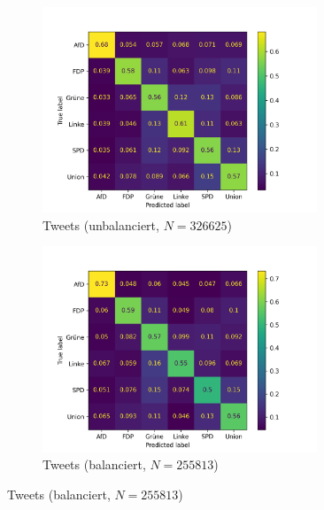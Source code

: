\begin{figure}[H]
    \begin{subfigure}{0.5\textwidth}
      \centering
      \includegraphics[width=0.9\textwidth]{data/images/modeling/fasttext/none/tweets_confusion_matrix.png}
      \caption{Tweets (unbalanciert, \(N = \num{326625}\))} \label{sfig:confusionMatrixFastTextTweets}
    \end{subfigure}
    \begin{subfigure}{0.5\textwidth}
      \centering
      \includegraphics[width=0.9\textwidth]{data/images/modeling/fasttext/under/tweets_confusion_matrix.png}
      \caption{Tweets (balanciert, \(N = \num{255813}\))} \label{sfig:confusionMatrixFastTextTweetsBalanced}
    \end{subfigure}
    

\end{figure}
